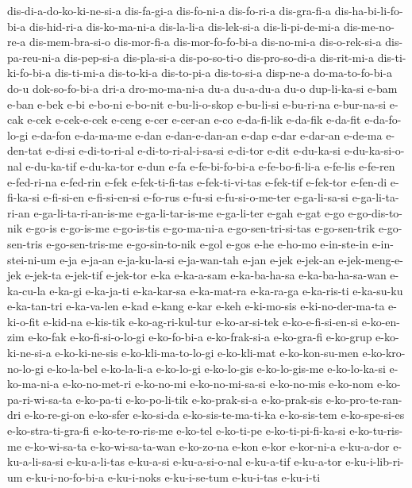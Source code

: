 {dis-di-a-do-ko-ki-ne-si-a dis-fa-gi-a dis-fo-ni-a dis-fo-ri-a dis-gra-fi-a
dis-ha-bi-li-fo-bi-a dis-hid-ri-a dis-ko-ma-ni-a dis-la-li-a dis-lek-si-a
dis-li-pi-de-mi-a dis-me-no-re-a dis-mem-bra-si-o dis-mor-fi-a
dis-mor-fo-fo-bi-a dis-no-mi-a dis-o-rek-si-a dis-pa-reu-ni-a dis-pep-si-a
dis-pla-si-a dis-po-so-ti-o dis-pro-so-di-a dis-rit-mi-a dis-ti-ki-fo-bi-a
dis-ti-mi-a dis-to-ki-a dis-to-pi-a dis-to-si-a disp-ne-a do-ma-to-fo-bi-a
do-u dok-so-fo-bi-a dri-a dro-mo-ma-ni-a du-a du-a-du-a du-o dup-li-ka-si
e-bam e-ban e-bek e-bi e-bo-ni e-bo-nit e-bu-li-o-skop e-bu-li-si
e-bu-ri-na e-bur-na-si e-cak e-cek e-cek-e-cek e-ceng e-cer e-cer-an e-co
e-da-fi-lik e-da-fik e-da-fit e-da-fo-lo-gi e-da-fon e-da-ma-me e-dan
e-dan-e-dan-an e-dap e-dar e-dar-an e-de-ma e-den-tat e-di-si
e-di-to-ri-al e-di-to-ri-al-i-sa-si e-di-tor e-dit e-du-ka-si
e-du-ka-si-o-nal e-du-ka-tif e-du-ka-tor e-dun e-fa e-fe-bi-fo-bi-a
e-fe-bo-fi-li-a e-fe-lis e-fe-ren e-fed-ri-na e-fed-rin e-fek
e-fek-ti-fi-tas e-fek-ti-vi-tas e-fek-tif e-fek-tor e-fen-di e-fi-ka-si
e-fi-si-en e-fi-si-en-si e-fo-rus e-fu-si e-fu-si-o-me-ter e-ga-li-sa-si
e-ga-li-ta-ri-an e-ga-li-ta-ri-an-is-me e-ga-li-tar-is-me e-ga-li-ter
e-gah e-gat e-go e-go-dis-to-nik e-go-is e-go-is-me e-go-is-tis
e-go-ma-ni-a e-go-sen-tri-si-tas e-go-sen-trik e-go-sen-tris
e-go-sen-tris-me e-go-sin-to-nik e-gol e-gos e-he e-ho-mo e-in-ste-in
e-in-stei-ni-um e-ja e-ja-an e-ja-ku-la-si e-ja-wan-tah e-jan e-jek
e-jek-an e-jek-meng-e-jek e-jek-ta e-jek-tif e-jek-tor e-ka e-ka-a-sam
e-ka-ba-ha-sa e-ka-ba-ha-sa-wan e-ka-cu-la e-ka-gi e-ka-ja-ti e-ka-kar-sa
e-ka-mat-ra e-ka-ra-ga e-ka-ris-ti e-ka-su-ku e-ka-tan-tri e-ka-va-len
e-kad e-kang e-kar e-keh e-ki-mo-sis e-ki-no-der-ma-ta e-ki-o-fit e-kid-na
e-kis-tik e-ko-ag-ri-kul-tur e-ko-ar-si-tek e-ko-e-fi-si-en-si e-ko-en-zim
e-ko-fak e-ko-fi-si-o-lo-gi e-ko-fo-bi-a e-ko-frak-si-a e-ko-gra-fi
e-ko-grup e-ko-ki-ne-si-a e-ko-ki-ne-sis e-ko-kli-ma-to-lo-gi e-ko-kli-mat
e-ko-kon-su-men e-ko-kro-no-lo-gi e-ko-la-bel e-ko-la-li-a e-ko-lo-gi
e-ko-lo-gis e-ko-lo-gis-me e-ko-lo-ka-si e-ko-ma-ni-a e-ko-no-met-ri
e-ko-no-mi e-ko-no-mi-sa-si e-ko-no-mis e-ko-nom e-ko-pa-ri-wi-sa-ta
e-ko-pa-ti e-ko-po-li-tik e-ko-prak-si-a e-ko-prak-sis e-ko-pro-te-ran-dri
e-ko-re-gi-on e-ko-sfer e-ko-si-da e-ko-sis-te-ma-ti-ka e-ko-sis-tem
e-ko-spe-si-es e-ko-stra-ti-gra-fi e-ko-te-ro-ris-me e-ko-tel e-ko-ti-pe
e-ko-ti-pi-fi-ka-si e-ko-tu-ris-me e-ko-wi-sa-ta e-ko-wi-sa-ta-wan
e-ko-zo-na e-kon e-kor e-kor-ni-a e-ku-a-dor e-ku-a-li-sa-si e-ku-a-li-tas
e-ku-a-si e-ku-a-si-o-nal e-ku-a-tif e-ku-a-tor e-ku-i-lib-ri-um
e-ku-i-no-fo-bi-a e-ku-i-noks e-ku-i-se-tum e-ku-i-tas e-ku-i-ti
}

